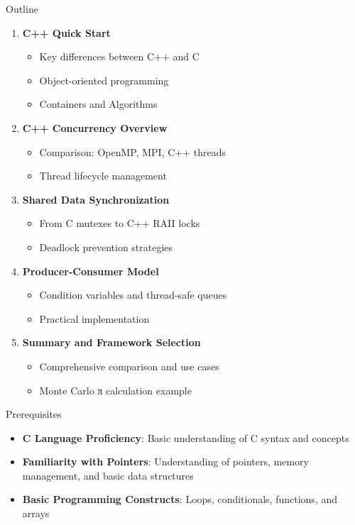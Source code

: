 \begin{frame}[fragile]{ Outline}
	\begin{enumerate}
		\item \textbf{C++ Quick Start}
		      \begin{itemize}
			      \item Key differences between C++ and C
				  \item Object-oriented programming
				  \item Containers and Algorithms
		      \end{itemize}
		\item \textbf{C++ Concurrency Overview}
		      \begin{itemize}
			      \item Comparison: OpenMP, MPI, C++ threads
			      \item Thread lifecycle management
		      \end{itemize}
		\item \textbf{Shared Data Synchronization}
		      \begin{itemize}
			      \item From C mutexes to C++ RAII locks
			      \item Deadlock prevention strategies
		      \end{itemize}
		\item \textbf{Producer-Consumer Model}
		      \begin{itemize}
			      \item Condition variables and thread-safe queues
			      \item Practical implementation
		      \end{itemize}
		\item \textbf{Summary and Framework Selection}
		      \begin{itemize}
			      \item Comprehensive comparison and use cases
			      \item Monte Carlo π calculation example
		      \end{itemize}
	\end{enumerate}
\end{frame}

\begin{frame}[fragile]{ Prerequisites}
	\begin{itemize}
		\item \textbf{C Language Proficiency}: Basic understanding of C syntax and concepts
		\item \textbf{Familiarity with Pointers}: Understanding of pointers, memory management, and basic data structures
		\item \textbf{Basic Programming Constructs}: Loops, conditionals, functions, and arrays
	\end{itemize}
\end{frame}
